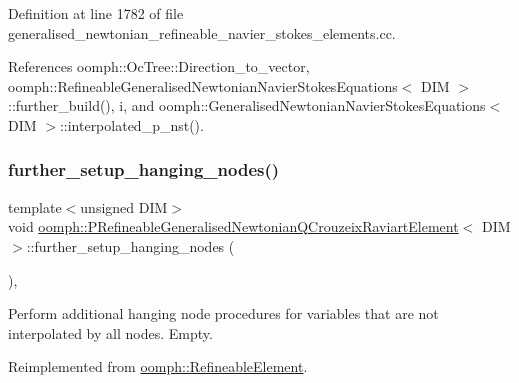 Definition at line 1782 of file generalised\+\_\+newtonian\+\_\+refineable\+\_\+navier\+\_\+stokes\+\_\+elements.\+cc.



References oomph\+::\+Oc\+Tree\+::\+Direction\+\_\+to\+\_\+vector, oomph\+::\+Refineable\+Generalised\+Newtonian\+Navier\+Stokes\+Equations$<$ D\+I\+M $>$\+::further\+\_\+build(), i, and oomph\+::\+Generalised\+Newtonian\+Navier\+Stokes\+Equations$<$ D\+I\+M $>$\+::interpolated\+\_\+p\+\_\+nst().

\mbox{\label{classoomph_1_1PRefineableGeneralisedNewtonianQCrouzeixRaviartElement_a091f934cd38661cb0f2c0b19a9e3c042}} 
\subsubsection{\texorpdfstring{further\+\_\+setup\+\_\+hanging\+\_\+nodes()}{further\_setup\_hanging\_nodes()}}
{\footnotesize\ttfamily template$<$unsigned D\+IM$>$ \\
void \hyperlink{classoomph_1_1PRefineableGeneralisedNewtonianQCrouzeixRaviartElement}{oomph\+::\+P\+Refineable\+Generalised\+Newtonian\+Q\+Crouzeix\+Raviart\+Element}$<$ D\+IM $>$\+::further\+\_\+setup\+\_\+hanging\+\_\+nodes (\begin{DoxyParamCaption}{ }\end{DoxyParamCaption})\hspace{0.3cm}{\ttfamily [inline]}, {\ttfamily [virtual]}}



Perform additional hanging node procedures for variables that are not interpolated by all nodes. Empty. 



Reimplemented from \hyperlink{classoomph_1_1RefineableElement_a86ea01c485f7ff822dce74b884312ccb}{oomph\+::\+Refineable\+Element}.



